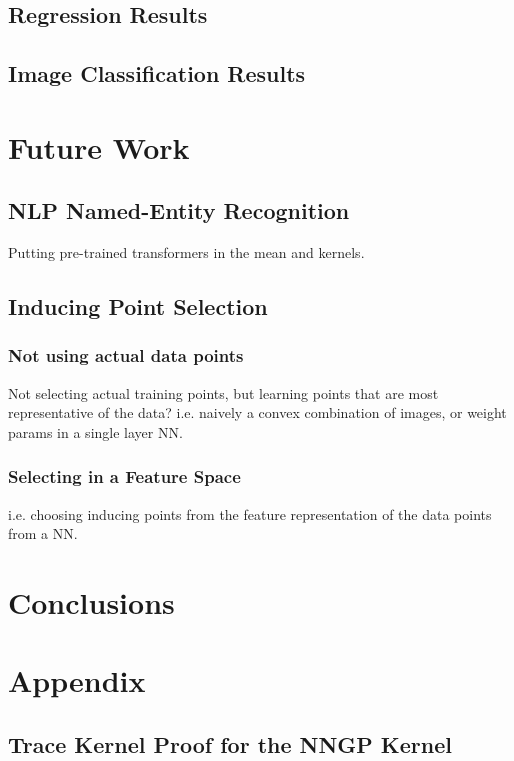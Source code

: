 \documentclass{article}
\numberwithin{equation}{section}
\begin{document}
\subsection{Regression Results}

\subsection{Image Classification Results}

\newpage
\section{Future Work}
\subsection{NLP Named-Entity Recognition}
Putting pre-trained transformers in the mean and kernels. 


\subsection{Inducing Point Selection}
\subsubsection{Not using actual data points}
Not selecting actual training points, but learning points that are most representative of the data? i.e. naively a convex combination of images, or weight params in a single layer NN.
\subsubsection{Selecting in a Feature Space}
i.e. choosing inducing points from the feature representation of the data points from a NN.


\newpage
\section{Conclusions}

\newpage



\newpage
\appendix
\section{Appendix}

\subsection{Trace Kernel Proof for the NNGP Kernel}\label{svgp-kld-bayesian}
\end{document}
